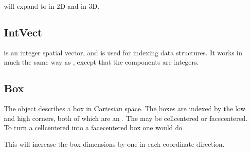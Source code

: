 \documentclass[letterpaper,10pt,english]{sphinxmanual}
\begin{document}
\begin{sphinxVerbatim}[commandchars=\\\{\},formatcom=\scriptsize]
   
\end{sphinxVerbatim}

will expand to  in 2D and  in 3D.


\subsection{IntVect}
\label{\detokenize{Source/ChomboBasics:intvect}}
 is an integer spatial vector, and is used for indexing data structures.
It works in much the same way as , except that the components are integers.


\subsection{Box}
\label{\detokenize{Source/ChomboBasics:box}}
The  object describes a box in Cartesian space.
The boxes are indexed by the low and high corners, both of which are an .
The  may be cell\sphinxhyphen{}centered or face\sphinxhyphen{}centered.
To turn a cell\sphinxhyphen{}centered  into a face\sphinxhyphen{}centered box one would do

\begin{sphinxVerbatim}[commandchars=\\\{\},formatcom=\scriptsize]
   
                
\end{sphinxVerbatim}

This will increase the box dimensions by one in each coordinate direction.
\end{document}

